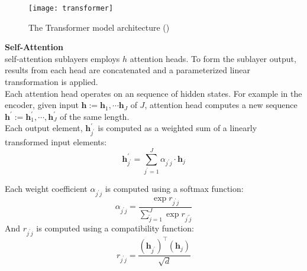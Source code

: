 \begin{figure}[t]
	\centering
	\texttt{[image: transformer]}
	\caption{The Transformer model architecture (\cite{vaswani2017attention})}
\end{figure}
%
%
\textbf{Self-Attention}\\
self-attention sublayers employs $h$ attention heads. To form the sublayer output, results from each head are concatenated and a parameterized linear transformation is applied.\\
Each attention head operates on an sequence of hidden states. For example in the encoder, given input $\bm{h}:=\bm{h}_1, \cdots \bm{h}_J$ of $J$, attention head computes a new sequence $\bm{h}^{\prime}:= \bm{h}_1^{\prime}, \cdots, \bm{h}_J^{\prime}$ of the same length.\\
Each output element, $\bm{h}_{j^{\prime}}^{\prime}$ is computed as a weighted sum of a linearly transformed input elements:
\[ \bm{h}_{j^{\prime}}^{\prime} = \sum_{{j^{\prime}}=1}^{J} \alpha_{{j^{\prime}}j}\cdot \bm{h}_{j} \]

Each weight coefficient $\alpha_{{j^{\prime}}j}$ is computed using a softmax function:
\[\alpha_{{j^{\prime}}j} = \frac{\exp {r_{{j^{\prime}}j}}}{\sum_{{\tilde{j}}=1}^{J} \exp  {r_{{j^{\prime}}{\tilde{j}}}}}\]
And $r_{{j^{\prime}}j}$ is computed using a compatibility function:
\[r_{{j^{\prime}}j} = \frac{(\bm{h}_{j^{\prime}})^{\top}(\bm{h}_j)}{\sqrt{d}} \]

